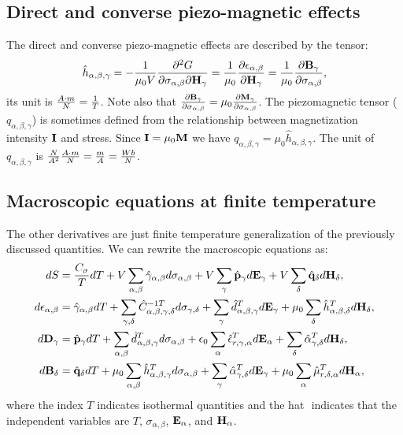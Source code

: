 \documentclass[12pt,a4paper]{article}
\begin{document}
\subsection{Direct and converse piezo-magnetic effects}
The direct and converse piezo-magnetic effects are described by the 
tensor:
\begin{equation}
\hat h_{\alpha,\beta,\gamma}=-{1\over \mu_0 V} {\partial^2 G \over
\partial \sigma_{\alpha,\beta} \partial {\bf H}_\gamma}= {1\over \mu_0}
{\partial \epsilon_{\alpha,\beta} \over \partial {\bf H}_\gamma}= 
{1 \over \mu_0}{\partial {\bf B}_\gamma \over \partial \sigma_{\alpha,\beta}},
\end{equation}
its unit is ${A\cdot m \over N} = {1\over T}$. Note also that 
${\partial {\bf B}_\gamma \over \partial \sigma_{\alpha,\beta}}
=\mu_0 {\partial {\bf M}_\gamma \over \partial \sigma_{\alpha,\beta}}$.
The piezomagnetic tensor 
($q_{\alpha,\beta,\gamma}$) is sometimes defined
from the relationship between magnetization intensity ${\bf I}$
and stress. Since ${\bf I}=\mu_0 {\bf M}$ we have
$q_{\alpha,\beta,\gamma}=\mu_0 \hat h_{\alpha,\beta,\gamma}$. The
unit of $q_{\alpha,\beta,\gamma}$ is ${N\over A^2}{A \cdot m\over N}
={m\over A}={Wb\over N}$. 


\subsection{Macroscopic equations at finite temperature}
The other derivatives are just finite temperature generalization of the
previously discussed quantities. We can rewrite the macroscopic equations as:
\begin{align}
dS&= {C_\sigma\over T} dT+ V \sum_{\alpha,\beta} \hat \gamma_{\alpha,\beta} 
d\sigma_{\alpha,\beta}
+ V \sum_\gamma \hat {\bf p}_\gamma d{\bf E}_{\gamma} + 
V \sum_\delta \hat {\bf q}_\delta d{\bf H}_{\delta}, \\
d\epsilon_{\alpha,\beta}&= \hat \gamma_{\alpha,\beta} dT + 
\sum_{\gamma,\delta} \hat C^{-1 T}_{\alpha,\beta,\gamma,\delta} 
d \sigma_{\gamma,\delta} + \sum_\gamma \hat d^T_{\alpha,\beta,\gamma} 
d{\bf E}_{\gamma} +\mu_0 
\sum_\delta \hat h^T_{\alpha,\beta,\delta} d{\bf H}_{\delta}, \\
d{\bf D}_\gamma&=
\hat {\bf p}_\gamma dT + \sum_{\alpha,\beta} \hat 
d^T_{\alpha,\beta,\gamma} d\sigma_{\alpha,\beta}
+\epsilon_0 \sum_\alpha \hat \epsilon^T_{r,\gamma,\alpha} d{\bf E}_{\alpha} + 
\sum_\delta \hat \alpha^T_{\gamma,\delta} d{\bf H}_{\delta}, \\
d{\bf B}_\delta&=
\hat {\bf q}_\delta dT+ \mu_0 \sum_{\alpha,\beta}
\hat h^T_{\alpha,\beta,\gamma}
d\sigma_{\alpha,\beta}
+\sum_\gamma \hat \alpha^T_{\gamma,\delta}
d{\bf E}_{\gamma}+ \mu_0
\sum_\alpha \hat \mu^T_{r,\delta,\alpha}
d{\bf H}_{\alpha}, 
\end{align}
where the index $T$ indicates isothermal quantities and the hat $\hat{}$
indicates that the independent variables are $T$, $\sigma_{\alpha,\beta}$, 
${\bf E}_\alpha$, and ${\bf H}_\alpha$. 
\end{document}
